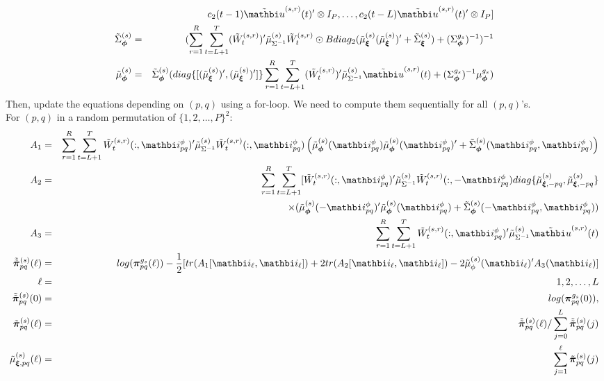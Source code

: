\documentclass[12pt,titlepage,fleqn]{article}
\newcommand{\1}{{\bm 1}}
\newcommand{\vu}{\mathbi u}
\newcommand{\vi}{\mathbi i}
\newcommand{\vphi}{\boldsymbol \phi}
\newcommand{\vxi}{\boldsymbol \xi}
\newcommand{\vpi}{\boldsymbol{\pi}}
\newcommand{\gs}{^{g_s}}
\newcommand{\s}{^{(s)}}
\newcommand{\sr}{^{(s,r)}}
\begin{document}
{\begin{eqnarray*}
&& c_2(t-1)\tilde{\vu}\sr(t)'\otimes I_P, \dots,  c_2(t-L)\tilde{\vu}\sr(t)'\otimes I_P]\\
\tilde{\Sigma}_{\vphi}\s&=& (\sum_{r=1}^R\sum_{t=L+1}^{T}(\tilde{W}_t\sr)'\tilde{\mu}_{\Sigma^{-1}}\s\tilde{W}_t\sr\odot Bdiag_2(\tilde{\mu}_{\vxi}\s(\tilde{\mu}_{\vxi}\s)' + \tilde{\Sigma}_{\vxi}\s) +(\Sigma_{\vphi}\gs)^{-1})^{-1} \\
\tilde{\mu}_{\vphi}\s &=& \tilde{\Sigma}_{\vphi}\s(diag\{[(\tilde{\mu}_{\vxi}\s)',(\tilde{\mu}_{\vxi}\s)']\}\sum_{r=1}^{R}\sum_{t=L+1}^{T}(\tilde{W}_t\sr)'\tilde{\mu}_{\Sigma^{-1}}\s\tilde{\vu}\sr(t)+(\Sigma_{\vphi}\gs)^{-1}\mu_{\vphi}\gs)
\end{eqnarray*}
Then, update the equations depending on $(p,q)$ using a for-loop. We need to compute them sequentially for all $(p,q)$'s. \\
For $(p,q)$ in a random permutation of $\{1,2,\dots, P\}^2$: 
\begin{eqnarray*}
A_1 &=& \sum_{r=1}^{R}\sum_{t=L+1}^{T}\tilde{W}_t\sr(:,\vi^{\phi}_{pq})'\tilde{\mu}_{\Sigma^{-1}}\s\tilde{W}_t\sr(:,\vi^{\phi}_{pq})\left(\tilde{\mu}_{\vphi}\s(\vi^{\phi}_{pq})\tilde{\mu}_{\vphi}\s(\vi^{\phi}_{pq})' + \tilde{\Sigma}_{\vphi}\s(\vi^{\phi}_{pq}, \vi^{\phi}_{pq}) \right)\\
A_2 &=& \sum_{r=1}^{R}\sum_{t=L+1}^{T}[\tilde{W}_t\sr(:, \vi^{\phi}_{pq})'\tilde{\mu}_{\Sigma^{-1}}\s\tilde{W}_t\sr(:, -\vi^{\phi}_{pq}) diag\{\tilde{\mu}_{\vxi,-pq}\s, \tilde{\mu}_{\vxi,-pq}\s\} \\
&&\times (\tilde{\mu}_{\vphi}\s(-\vi^{\phi}_{pq})'\tilde{\mu}_{\vphi}\s(\vi^{\phi}_{pq})
+\tilde{\Sigma}_{\vphi}\s(-\vi^{\phi}_{pq}, \vi^{\phi}_{pq}))\\
A_3 &=& \sum_{r=1}^{R}\sum_{t=L+1}^{T}\tilde{W}_t\sr(:, \vi^{\phi}_{pq})'\tilde{\mu}_{\Sigma^{-1}}\s \tilde{\vu}\sr(t)\\
\tilde{\tilde{\vpi}}_{pq}\s(\ell)&= & log(\vpi_{pq}\gs(\ell)) -\frac{1}{2}[ tr(A_1[\vi_{\ell},\vi_{\ell}]) + 2tr(A_2[\vi_{\ell},\vi_{\ell}]) - 2\tilde{\mu}_{\phi}\s(\vi_{\ell})'A_3(\vi_{\ell})]\\
\ell&=&1,2,\dots, L\\
\tilde{\tilde{\vpi}}_{pq}\s(0)&= & log(\vpi_{pq}\gs(0)), \\
\tilde{\vpi}_{pq}\s(\ell) &=& \tilde{\tilde{\vpi}}_{pq}\s(\ell)/\sum_{j=0}^L \tilde{\tilde{\vpi}}_{pq}\s(j)\\ 
\tilde{\mu}_{\vxi,pq}\s(\ell) &=& \sum_{j=1}^{\ell}\tilde{\vpi}_{pq}\s(j)\\

\end{eqnarray*}}
\end{document}

